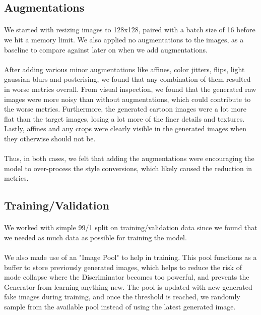 \documentclass[twoside,english,notitlepage]{report}
\begin{document}
\subsection{Augmentations}
\paragraph{} We started with resizing images to 128x128, paired with a batch size of 16 before we hit a memory limit. We also applied no augmentations to the images, as a baseline to compare against later on when we add augmentations. 

\paragraph{} After adding various minor augmentations like affines, color jitters, flips, light gaussian blurs and posterising, we found that any combination of them resulted in worse metrics overall. From visual inspection, we found that the generated raw images were more noisy than without augmentations, which could contribute to the worse metrics. Furthermore, the generated cartoon images were a lot more flat than the target images, losing a lot more of the finer details and textures. Lastly, affines and any crops were clearly visible in the generated images when they otherwise should not be. 

\paragraph{} Thus, in both cases, we felt that adding the augmentations were encouraging the model to over-process the style conversions, which likely caused the reduction in metrics. 

\subsection{Training/Validation}
\paragraph{} We worked with simple 99/1 split on training/validation data since we found that we needed as much data as possible for training the model.

\paragraph{} We also made use of an "Image Pool" to help in training. This pool functions as a buffer to store previously generated images, which helps to reduce the risk of mode collapse where the Discriminator becomes too powerful, and prevents the Generator from learning anything new. The pool is updated with new generated fake images during training, and once the threshold is reached, we randomly sample from the available pool instead of using the latest generated image. 
\end{document}
